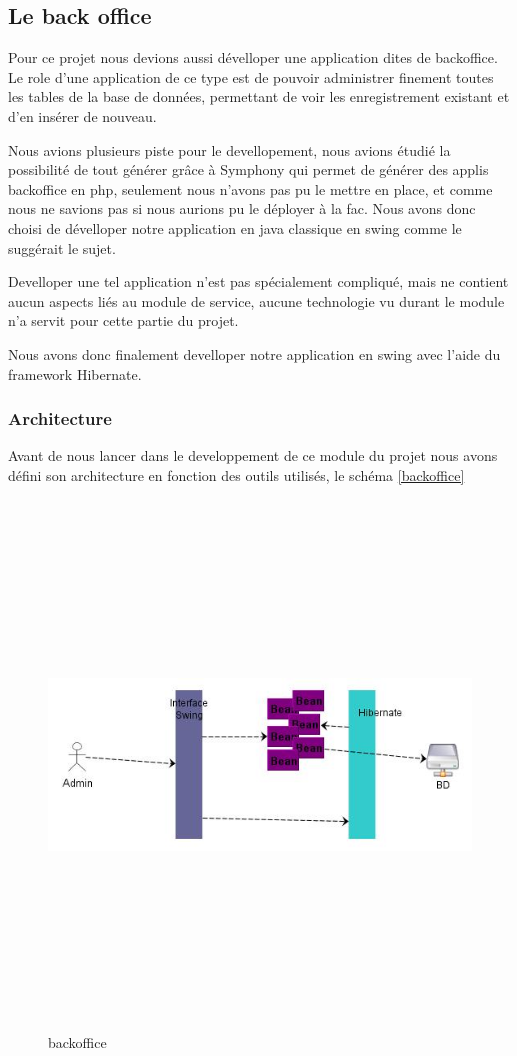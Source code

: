 \documentclass[11pt,a4paper]{article}
\begin{document}
\subsection{Le back office}

Pour ce projet nous devions aussi dévelloper une application dites de backoffice. Le role d'une application de ce type est de pouvoir administrer finement toutes les tables de la base de données, permettant de voir les enregistrement existant et d'en insérer de nouveau. 

Nous avions plusieurs piste pour le devellopement, nous avions étudié la possibilité de tout générer grâce à Symphony qui permet de générer des applis backoffice en php, seulement nous n'avons pas pu le mettre en place, et comme nous ne savions pas si nous aurions pu le déployer à la fac. Nous avons donc choisi de dévelloper notre application en java classique en swing comme le suggérait le sujet.

Develloper une tel application n'est pas spécialement compliqué, mais ne contient aucun aspects liés au module de service, aucune technologie vu durant le module n'a servit pour cette partie du projet.

Nous avons donc finalement develloper notre application en swing avec l'aide du framework Hibernate. 


\subsubsection{Architecture}

Avant de nous lancer dans le developpement de ce module du projet nous avons défini son architecture en fonction des outils utilisés, le schéma \ref{backoffice} 

\begin{figure}[h]
  		\centering
  		\includegraphics[height=14cm,width=15cm]{backoffice.jpg}
  		\caption{backoffice}
  		\label{Architecture du backoffice}
\end{figure}
\end{document}
